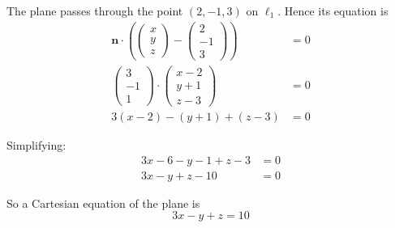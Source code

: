 \documentclass[leqno]{article}
\begin{document}
\begin{enumerate}[
  label=\textbf{\arabic*.},
  leftmargin=*,
  topsep=0pt,
  partopsep=0pt,
  parsep=0pt
]
\begin{djsSolution}
\begin{enumerate}[label=\textbf{(\roman*)}]
  The plane passes through the point \((2,-1,3)\) on \(\ell_1\). Hence its equation is
  \begin{align*}
  \mathbf n\cdot\left(\begin{pmatrix}x\\y\\z\end{pmatrix}-\begin{pmatrix}2\\-1\\3\end{pmatrix}\right)&=0\\
  \begin{pmatrix}3\\-1\\1\end{pmatrix}\cdot\begin{pmatrix}x-2\\y+1\\z-3\end{pmatrix}&=0\\
  3(x-2)-(y+1)+(z-3)&=0
  \end{align*}

  Simplifying:
  \begin{align*}
  3x-6-y-1+z-3&=0\\
  3x-y+z-10&=0
  \end{align*}

  So a Cartesian equation of the plane is
  \[
  3x-y+z=10
  \]
\end{enumerate}
\end{djsSolution}


\newpage

\questionitem


\end{enumerate}
\end{document}
